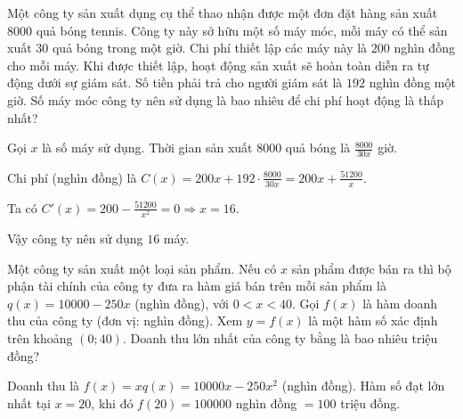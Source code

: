 \begin{baitap}
	Một công ty sản xuất dụng cụ thể thao nhận được một đơn đặt hàng sản xuất \num{8000} quả bóng tennis. Công ty này sở hữu một số máy móc, mỗi máy có thể sản xuất $30$ quả bóng trong một giờ. Chi phí thiết lập các máy này là $200$ nghìn đồng cho mỗi máy. Khi được thiết lập, hoạt động sản xuất sẽ hoàn toàn diễn ra tự động dưới sự giám sát. Số tiền phải trả cho người giám sát là $192$ nghìn đồng một giờ. Số máy móc công ty nên sử dụng là bao nhiêu để chi phí hoạt động là thấp nhất?
	\begin{traloi}
		
		Gọi \(x\) là số máy sử dụng. Thời gian sản xuất \(\num{8000}\) quả bóng là \(\frac{8000}{30x}\) giờ.
		
		Chi phí (nghìn đồng) là \(C(x)=200x+192\cdot\frac{8000}{30x}=200x+\frac{51200}{x}\).
		
		Ta có \(C'(x)=200-\frac{51200}{x^2}=0\Rightarrow x=16\).
		
		Vậy công ty nên sử dụng \(16\) máy.
	\end{traloi}
\end{baitap}

\begin{baitap}
	Một công ty sản xuất một loại sản phẩm. Nếu có $x$ sản phẩm được bán ra thì bộ phận tài chính của công ty đưa ra hàm giá bán trên mỗi sản phẩm là $q(x) = 10000 - 250x$ (nghìn đồng), với $0 < x < 40$. Gọi $f(x)$ là hàm doanh thu của công ty (đơn vị: nghìn đồng). Xem $y = f(x)$ là một hàm số xác định trên khoảng $(0; 40)$. Doanh thu lớn nhất của công ty bằng là bao nhiêu triệu đồng?
	\begin{traloi}
		\dapan{100}
		
		Doanh thu là \(f(x)=xq(x)=10000x-250x^2\) (nghìn đồng). Hàm số đạt lớn nhất tại \(x=20\), khi đó \(f(20)=100000\) nghìn đồng \(=100\) triệu đồng.
	\end{traloi}
\end{baitap}